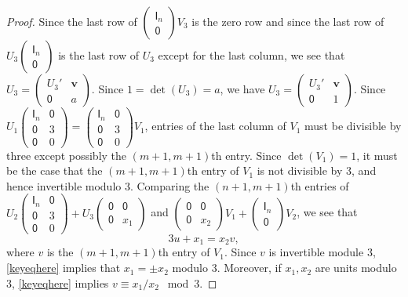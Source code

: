 \documentclass[12pt]{amsbook}%
\theoremstyle{defin}
\theoremstyle{remark}
\numberwithin{equation}{chapter}
\numberwithin{theor}{section}
\newcommand{\idmatrix}{\mathsf{I}}
\newcommand{\zmatrix}{\mathsf{0}}
\begin{document}
\begin{proof}
Since the last row of $\left(\begin{smallmatrix} \idmatrix_n \\ \zmatrix \end{smallmatrix}\right) V_3$ is the zero row and since the last row of $U_3 \left(\begin{smallmatrix} \idmatrix_n \\ \zmatrix \end{smallmatrix}\right)$ is the last row of $U_3$ except for the last column, we see that $U_3 = \left(\begin{smallmatrix} U_3' & \mathbf{v} \\ \zmatrix & a \end{smallmatrix}\right)$.  Since $1=\det(U_3) = a$, we have $U_3 = \left(\begin{smallmatrix} U_3' & \mathbf{v} \\   \zmatrix & 1 \end{smallmatrix}\right)$.  Since $U_1 \left( \begin{smallmatrix} \idmatrix_n & \zmatrix \\ \zmatrix & 3 \\ \zmatrix & 0 \end{smallmatrix} \right) = \left( \begin{smallmatrix} \idmatrix_n & \zmatrix \\ \zmatrix & 3 \\ \zmatrix & 0 \end{smallmatrix} \right) V_1$, entries of the last column of $V_1$ must be divisible by three except possibly the $(m+1, m+1)$th entry.  Since $\det(V_1)=1$, it must be the case that the $(m+1,m+1)$th entry of $V_1$ is not divisible by 3, and hence invertible modulo 3.  Comparing the $(n+1, m+1)$th entries of $U_2 \left( \begin{smallmatrix} \idmatrix_n & \zmatrix \\ \zmatrix & 3 \\ \zmatrix & 0 \end{smallmatrix} \right)  + U_3 \left( \begin{smallmatrix} \zmatrix & \zmatrix \\ \zmatrix  & x_1 \end{smallmatrix} \right)$ and $\left( \begin{smallmatrix} \zmatrix & \zmatrix \\ \zmatrix  & x_2 \end{smallmatrix} \right) V_1 
+ \left( \begin{smallmatrix} \idmatrix_n  \\ \zmatrix \end{smallmatrix} \right) V_2$, we see that 
\begin{equation}\label{keyeqhere}
3u + x_1 = x_2 v,
\end{equation}
where $v$ is the $(m+1,m+1)$th entry of $V_1$.  Since $v$ is invertible module 3, \eqref{keyeqhere} implies that $x_1 = \pm x_2$ modulo 3.  Moreover, if $x_1, x_2$ are units modulo 3, \eqref{keyeqhere} implies $v \equiv x_1/x_2 \; \bmod 3$.


\end{proof}
\end{document}

